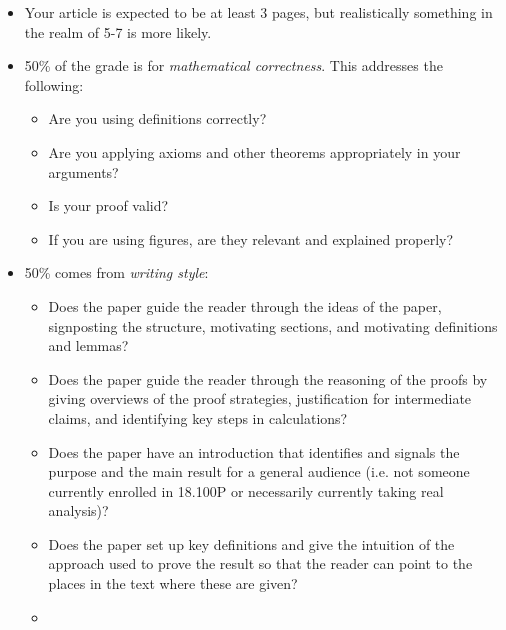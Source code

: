 \documentclass{article}
\begin{document}
    \begin{itemize}
        \item
            Your article is expected to be at least 3 pages,
            but realistically something in the realm of 5-7 is more likely.
        \item
            50\% of the grade is for \textit{mathematical correctness}.
            This addresses the following:
            \begin{itemize}
                \item
                    Are you using definitions correctly?
                \item
                    Are you applying axioms and other theorems
                    appropriately in your arguments?
                \item
                    Is your proof valid?
                \item
                    If you are using figures, are they relevant and explained
                    properly?
            \end{itemize}
        \item
            50\% comes from \textit{writing style}:
            \begin{itemize}
                \item
                    Does the paper guide the reader through the ideas of the
                    paper, signposting the structure, motivating sections, and
                    motivating definitions and lemmas?
                \item
                    Does the paper guide the reader through the reasoning of
                    the proofs by giving overviews of the proof strategies,
                    justification for intermediate claims,
                    and identifying key steps in calculations?
                \item
                    Does the paper have an introduction that identifies and
                    signals the purpose and the main result for a general
                    audience (i.e. not someone currently enrolled in 18.100P
                    or necessarily currently taking real analysis)?
                 \item
                    Does the paper set up key definitions and give the
                    intuition of the approach used to prove the result
                    so that the reader can point to the places in the
                    text where these are given?
                 \item

\end{itemize}
\end{itemize}
\end{document}
